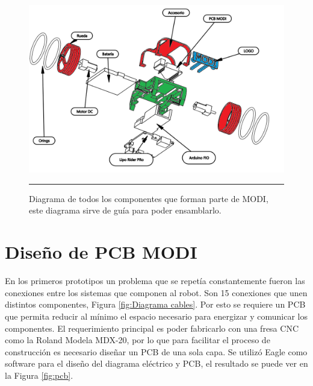 \begin{figure}[htbp]
	\centering
		\includegraphics[width=\textwidth]{./Figures/MODI/ensamble.png}
		\rule{35em}{0.5pt}
	\caption[Diagrama MODI versión final]{Diagrama de todos los componentes que forman parte de MODI, este diagrama sirve de guía para poder ensamblarlo.}
	\label{fig:DiagramaVersionFinal}
\end{figure}	

\FloatBarrier
\section{Diseño de PCB MODI}

En los primeros prototipos un problema que se repetía constantemente fueron las conexiones entre los sistemas que componen al robot. Son 15 conexiones que unen distintos componentes, Figura \ref{fig:Diagrama cables}. Por esto se requiere un PCB que permita reducir al mínimo el espacio necesario para energizar y comunicar los componentes. El requerimiento principal es poder fabricarlo con una fresa CNC como la Roland Modela MDX-20, por lo que para facilitar el proceso de construcción es necesario diseñar un PCB de una sola capa. Se utilizó Eagle como software para el diseño del diagrama eléctrico y PCB, el resultado se puede ver en la Figura \ref{fig:pcb}.


